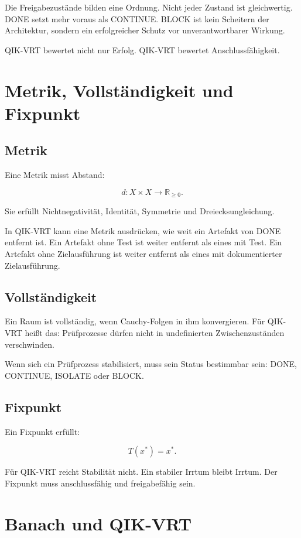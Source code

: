 \documentclass[11pt,a4paper,oneside]{book}
\begin{document}
Die Freigabezustände bilden eine Ordnung. Nicht jeder Zustand ist gleichwertig. DONE setzt mehr voraus als CONTINUE. BLOCK ist kein Scheitern der Architektur, sondern ein erfolgreicher Schutz vor unverantwortbarer Wirkung.

QIK-VRT bewertet nicht nur Erfolg. QIK-VRT bewertet Anschlussfähigkeit.

\chapter{Metrik, Vollständigkeit und Fixpunkt}

\section{Metrik}

Eine Metrik misst Abstand:

\[
d:X\times X\to \mathbb{R}_{\geq 0}.
\]

Sie erfüllt Nichtnegativität, Identität, Symmetrie und Dreiecksungleichung.

In QIK-VRT kann eine Metrik ausdrücken, wie weit ein Artefakt von DONE entfernt ist. Ein Artefakt ohne Test ist weiter entfernt als eines mit Test. Ein Artefakt ohne Zielausführung ist weiter entfernt als eines mit dokumentierter Zielausführung.

\section{Vollständigkeit}

Ein Raum ist vollständig, wenn Cauchy-Folgen in ihm konvergieren. Für QIK-VRT heißt das: Prüfprozesse dürfen nicht in undefinierten Zwischenzuständen verschwinden.

Wenn sich ein Prüfprozess stabilisiert, muss sein Status bestimmbar sein: DONE, CONTINUE, ISOLATE oder BLOCK.

\section{Fixpunkt}

Ein Fixpunkt erfüllt:

\[
T(x^*)=x^*.
\]

Für QIK-VRT reicht Stabilität nicht. Ein stabiler Irrtum bleibt Irrtum. Der Fixpunkt muss anschlussfähig und freigabefähig sein.

\chapter{Banach und QIK-VRT}
\end{document}
